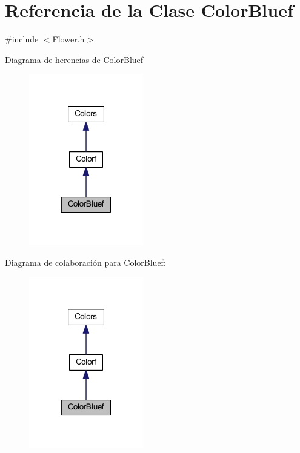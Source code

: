 \hypertarget{class_color_bluef}{}\section{Referencia de la Clase Color\+Bluef}
\label{class_color_bluef}


{\ttfamily \#include $<$Flower.\+h$>$}



Diagrama de herencias de Color\+Bluef
\nopagebreak
\begin{figure}[H]
\begin{center}
\leavevmode
\includegraphics[width=141pt]{class_color_bluef__inherit__graph}
\end{center}
\end{figure}


Diagrama de colaboración para Color\+Bluef\+:
\nopagebreak
\begin{figure}[H]
\begin{center}
\leavevmode
\includegraphics[width=141pt]{class_color_bluef__coll__graph}
\end{center}
\end{figure}
